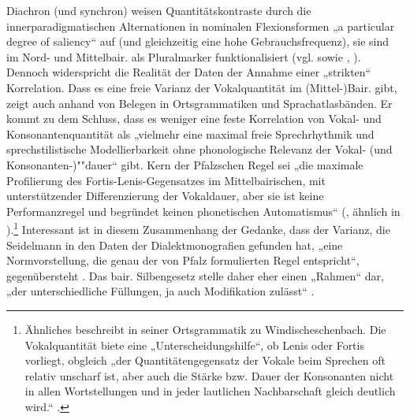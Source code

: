 Diachron (und synchron) weisen Quantitätskontraste durch die innerparadigmatischen Alternationen in nominalen Flexionsformen „a particular degree of saliency“ \citep[116]{Seiler2005} auf (und gleichzeitig eine hohe Gebrauchsfrequenz), sie sind im Nord- und Mittelbair. als Pluralmarker funktionalisiert (vgl. \cites[118]{Seiler2005}[195]{Seiler2008} sowie \citealt[16]{Pfalz1936}, \citealt[123]{Rowley1997}). Dennoch widerspricht die Realität der Daten der Annahme einer „strikten“ Korrelation. Dass es eine freie Varianz der Vokalquantität im (Mittel-)Bair. gibt, zeigt auch \citet{Seidelmann2013} anhand von Belegen in Ortsgrammatiken und Sprachatlasbänden. Er kommt zu dem Schluss, dass es weniger eine feste Korrelation von Vokal- und Konsonantenquantität als „vielmehr eine maximal freie Sprechrhythmik und sprechstilistische Modellierbarkeit ohne phonologische Relevanz der Vokal- (und Kon\-so\-nan\-ten-)""dauer“ \citep[61]{Seidelmann2013} gibt. Kern der Pfalzschen Regel sei „die maximale Profilierung des Fortis-Lenis-Gegensatzes im Mittelbairischen, mit unterstützender Differenzierung der Vokaldauer, aber sie ist keine Performanzregel und begründet keinen phonetischen Automatismus“ (\citealt[61]{Seidelmann2013}, ähnlich in \citealt{Seidelmann2002}).\footnote{Ähnliches beschreibt \citet{Denz1977} in seiner Ortsgrammatik zu Windischeschenbach. Die Vokalquantität biete eine „Unterscheidungshilfe“, ob Lenis oder Fortis vorliegt, obgleich „der Quantitätengegensatz der Vokale beim Sprechen oft relativ unscharf ist, aber auch die Stärke bzw. Dauer der Konsonanten nicht in allen Wortstellungen und in jeder lautlichen Nachbarschaft gleich deutlich wird.“ \citep[72]{Denz1977}.} Interessant ist in diesem Zusammenhang der Gedanke, dass der Varianz, die Seidelmann in den Daten der Dialektmonografien gefunden hat, „eine Normvorstellung, die genau der von Pfalz formulierten Regel entspricht“, gegenübersteht \citep[60]{Seidelmann2013}. Das bair. Silbengesetz stelle daher eher einen „Rahmen“ dar, „der unterschiedliche Füllungen, ja auch Modifikation zulässt“ \citep[104]{Seidelmann2002}.

